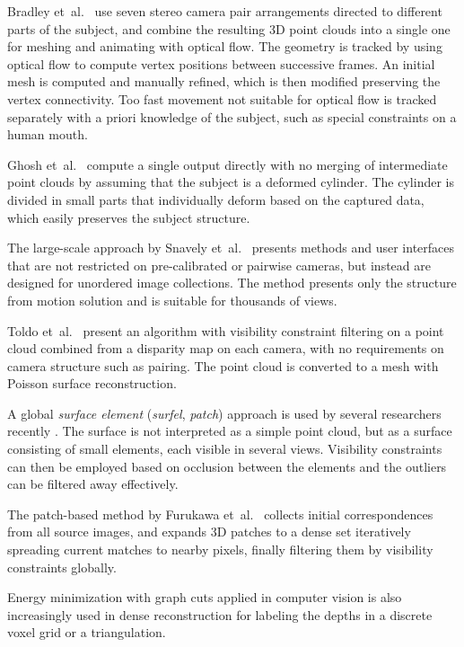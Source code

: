 Bradley et~al.\ \cite{bradley2010high} use seven stereo camera pair arrangements directed to different parts of the subject, and combine the resulting 3D point clouds into a single one for meshing and animating with optical flow.
The geometry is tracked by using optical flow to compute vertex positions between successive frames.
An initial mesh is computed and manually refined, which is then modified preserving the vertex connectivity.
Too fast movement not suitable for optical flow is tracked separately with a priori knowledge of the subject, such as special constraints on a human mouth.

Ghosh et~al.\ \cite{ghosh2011multiview} compute a single output directly with no merging of intermediate point clouds by assuming that the subject is a deformed cylinder.
The cylinder is divided in small parts that individually deform based on the captured data, which easily preserves the subject structure.

The large-scale approach by Snavely et~al.\ \cite{snavely2006photo} presents methods and user interfaces that are not restricted on pre-calibrated or pairwise cameras, but instead are designed for unordered image collections.
The method presents only the structure from motion solution and is suitable for thousands of views.

Toldo et~al.\ \cite{toldo2013accurate,toldo2013towards} present an algorithm with visibility constraint filtering on a point cloud combined from a disparity map on each camera, with no requirements on camera structure such as pairing.
The point cloud is converted to a mesh with Poisson surface reconstruction.

A global \emph{surface element} (\emph{surfel}, \emph{patch}) approach is used by several researchers recently \cite{carceroni2002multi,furukawa2010accurate,vu2012high,chang2011gpu}.
The surface is not interpreted as a simple point cloud, but as a surface consisting of small elements, each visible in several views.
Visibility constraints can then be employed based on occlusion between the elements and the outliers can be filtered away effectively.

The patch-based method by Furukawa et~al.\ \cite{furukawa2012patch,furukawa2010accurate} collects initial correspondences from all source images, and expands 3D patches to a dense set iteratively spreading current matches to nearby pixels, finally filtering them by visibility constraints globally.

Energy minimization with graph cuts applied in computer vision \cite{boykov2004experimental} is also increasingly used in dense reconstruction \cite{chang2011gpu,vu2012high,labatut2009robust,jancosek2011multi} for labeling the depths in a discrete voxel grid or a triangulation.

